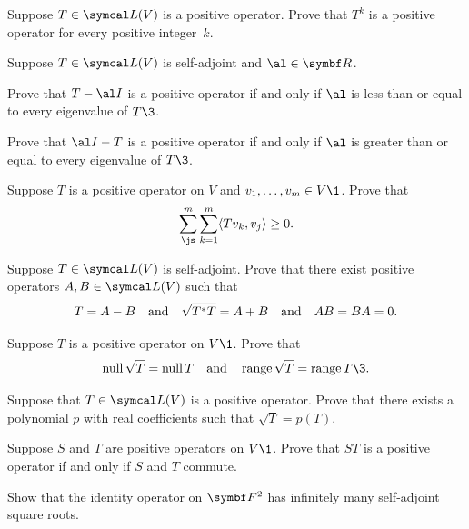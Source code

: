 \begin{exercises}
\exercise
Suppose $T \in \L(V)$ is a positive operator. Prove that $T^k$ is a positive operator for every positive integer~$k$.


\exercise
Suppose $T \in \L(V)$ is self-adjoint and $\al \in \R{}$.
\begin{subtheorem}
\item
Prove that $T - \al I$ is a positive operator if and only if $\al$ is less than or equal to every eigenvalue of $T\3$.
\item
Prove that $\al I - T$ is a positive operator if and only if $\al$ is greater than or equal to every eigenvalue of $T\3$.
\end{subtheorem}
\exercisesubtheoremend


\exercise
Suppose $T$ is a positive operator on $V$ and $v_1, \ldots, v_m \in V\1$. Prove that
\[
\sum_{\js}^m \sum_{k=1}^m \ip{Tv_k, v_j} \ge 0.
\]
\vspace{-14bp}


\exercise
Suppose $T \in \L(V)$ is self-adjoint. Prove that there exist positive operators $A, B \in \L(V)$ such that
\[
T = A - B \quad \text{and} \quad \sqrt{T^* T} = A + B \quad \text{and} \quad AB = BA = 0.
\]
\exercisedisplayend


\exercise
Suppose $T$ is a positive operator on $V\1$. Prove that
\[
\ker \sqrt{T} = \ker T \andd \ran \sqrt{T} = \ran T\3.
\]
\exercisedisplayend


\exercise
Suppose that $T \in \L(V)$ is a positive operator. Prove that there exists a polynomial $p$ with real coefficients such that
$\sqrt{T} = p(T)$. \label{2psqrt}

\exercise
Suppose $S$ and $T$ are positive operators on $V\1$. Prove that $ST$ is a positive operator if and only if $S$ and $T$ commute. \label{2ProdPos} 


\exercise
Show that the identity operator on $\F{2}$ has infinitely many self-adjoint square roots.

\end{exercises}
